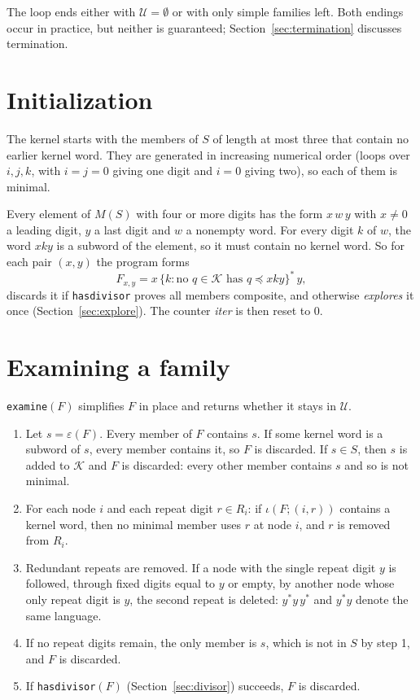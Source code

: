\documentclass[11pt]{article}
\theoremstyle{definition}
\theoremstyle{remark}
\newcommand{\K}{\mathcal{K}}
\newcommand{\U}{\mathcal{U}}
\newcommand{\code}[1]{\texttt{#1}}
\newcommand{\sw}{\preceq}   %
\begin{document}
The loop ends either with $\U=\emptyset$ or with only simple families left. Both endings occur in practice, but neither is guaranteed; Section~\ref{sec:termination} discusses termination.

\section{Initialization}

The kernel starts with the members of $S$ of length at most three that contain no earlier kernel word. They are generated in increasing numerical order (loops over $i,j,k$, with $i=j=0$ giving one digit and $i=0$ giving two), so each of them is minimal.

Every element of $M(S)$ with four or more digits has the form $x\,w\,y$ with $x\ne 0$ a leading digit, $y$ a last digit and $w$ a nonempty word. For every digit $k$ of $w$, the word $xky$ is a subword of the element, so it must contain no kernel word. So for each pair $(x,y)$ the program forms
\[
  F_{x,y}=x\,\{k: \text{no } q\in\K \text{ has } q\sw xky\}^*\,y,
\]
discards it if \code{hasdivisor} proves all members composite, and otherwise \emph{explores} it once (Section~\ref{sec:explore}). The counter \textit{iter} is then reset to $0$.

\section{Examining a family}\label{sec:examine}

\code{examine}$(F)$ simplifies $F$ in place and returns whether it stays in $\U$.

\begin{enumerate}[label=\arabic*.]
\item Let $s=\varepsilon(F)$. Every member of $F$ contains $s$. If some kernel word is a subword of $s$, every member contains it, so $F$ is discarded. If $s\in S$, then $s$ is added to $\K$ and $F$ is discarded: every other member contains $s$ and so is not minimal.
\item For each node $i$ and each repeat digit $r\in R_i$: if $\iota(F;(i,r))$ contains a kernel word, then no minimal member uses $r$ at node $i$, and $r$ is removed from $R_i$.
\item Redundant repeats are removed. If a node with the single repeat digit $y$ is followed, through fixed digits equal to $y$ or empty, by another node whose only repeat digit is $y$, the second repeat is deleted: $y^*y\,y^*$ and $y^*y$ denote the same language.
\item If no repeat digits remain, the only member is $s$, which is not in $S$ by step 1, and $F$ is discarded.
\item If \code{hasdivisor}$(F)$ (Section~\ref{sec:divisor}) succeeds, $F$ is discarded.
\end{enumerate}
\end{document}
